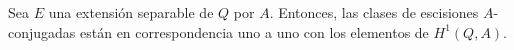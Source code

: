 
\begin{teorema}\label{h1}
	Sea $E$ una extensión separable de $Q$ por $A$. Entonces, las clases de escisiones $A$-conjugadas están en correspondencia uno a uno con los elementos de $H^1(Q,A)$.
\end{teorema}

